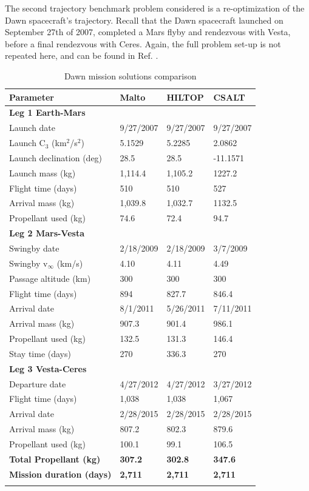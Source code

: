 \documentclass[ISTS  ]{tjsass} %
\newcommand{\bhline}[1]{\noalign{\hrule height #1}}
\begin{document}
The second trajectory benchmark problem considered is a re-optimization of the Dawn spacecraft\rq s trajectory. Recall that the Dawn spacecraft launched on September 27th of 2007, completed a Mars flyby and rendezvous with Vesta, before a final rendezvous with Ceres. Again, the full problem set-up is not repeated here, and can be found in Ref. .
%
\begin{table}
    \centering
    \caption{Dawn mission solutions comparison}
    \label{table:dawn_comparison}
    \begin{tabularx}{\columnwidth}{lXXX}\bhline{.8pt}
        \textbf{Parameter} & \textbf{Malto} & \textbf{HILTOP} & \textbf{CSALT} \\\hline
        \textbf{Leg 1 Earth-Mars} & & & \\
        Launch date & 9/27/2007 & 9/27/2007 & 9/27/2007\\
        Launch C$_3$ (km$^2$/s$^2$) & 5.1529 & 5.2285 & 2.0862\\
        Launch declination (deg) & 28.5 & 28.5 & -11.1571\\
        Launch mass (kg) & 1,114.4 & 1,105.2 & 1227.2\\
        Flight time (days) & 510 & 510 & 527\\
        Arrival mass (kg) & 1,039.8 & 1,032.7 & 1132.5\\
        Propellant used (kg) & 74.6 & 72.4 & 94.7\\
        \textbf{Leg 2 Mars-Vesta} & & & \\
        Swingby date & 2/18/2009 & 2/18/2009 & 3/7/2009\\
        Swingby v$_\infty$ (km/s) & 4.10 & 4.11 & 4.49\\
        Passage altitude (km) & 300 & 300 & 300\\
        Flight time (days) & 894 & 827.7 & 846.4\\
        Arrival date & 8/1/2011 & 5/26/2011 & 7/11/2011\\
        Arrival mass (kg) & 907.3 & 901.4 & 986.1\\
        Propellant used (kg) & 132.5 & 131.3 & 146.4\\
        Stay time (days) & 270 & 336.3 & 270\\
        \textbf{Leg 3 Vesta-Ceres} & & & \\
        Departure date & 4/27/2012 & 4/27/2012 & 3/27/2012\\
        Flight time (days) & 1,038 & 1,038 & 1,067\\
        Arrival date & 2/28/2015 & 2/28/2015 & 2/28/2015\\
        Arrival mass (kg) & 807.2 & 802.3 & 879.6\\
        Propellant used (kg) & 100.1 & 99.1 & 106.5\\
        \textbf{Total Propellant (kg)} & \textbf{307.2} & \textbf{302.8} & \textbf{347.6}\\
        \textbf{Mission duration (days)} & \textbf{2,711} & \textbf{2,711} & \textbf{2,711}\\\bhline{.8pt}
    \end{tabularx}
\end{table}
\end{document}
